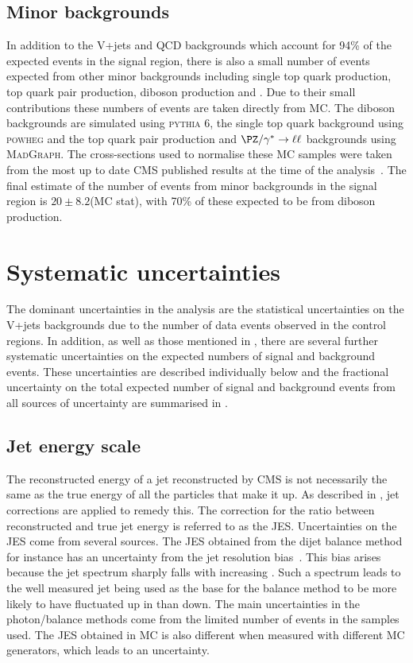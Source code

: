 \subsection{Minor backgrounds}
\label{sec:promptminor}
In addition to the V+jets and QCD backgrounds which account for 94\% of the expected events in the signal region, there is also a small number of events expected from other minor backgrounds including single top quark production, top quark pair production, diboson production and \Zmumu. Due to their small contributions these numbers of events are taken directly from \ac{MC}. The diboson backgrounds are simulated using \textsc{pythia 6}, the single top quark background using \textsc{powheg} and the top quark pair production and $\PZ/\gamma^{*}\rightarrow\ell\ell$ backgrounds using \textsc{MadGraph}. The cross-sections used to normalise these \ac{MC} samples were taken from the most up to date CMS published results at the time of the analysis~\cite{CMS:2012fza,CMS:2012iza,CMS:2012zva,CMS:2013qea,CMS:2013hea}. The final estimate of the number of events from minor backgrounds in the signal region is $20\pm 8.2$(MC stat), with 70\% of these expected to be from diboson production.


\section{Systematic uncertainties}
\label{sec:promptsyst}
The dominant uncertainties in the analysis are the statistical uncertainties on the V+jets backgrounds due to the number of data events observed in the control regions. In addition, as well as those mentioned in , there are several further systematic uncertainties on the expected numbers of signal and background events. These uncertainties are described individually below and the fractional uncertainty on the total expected number of signal and background events from all sources of uncertainty are summarised in .
\subsection{Jet energy scale}
\label{sec:promptjes}
The reconstructed energy of a jet reconstructed by CMS is not necessarily the same as the true energy of all the particles that make it up. As described in , jet corrections are applied to remedy this. The correction for the ratio between reconstructed and true jet energy is referred to as the \ac{JES}. Uncertainties on the \ac{JES} come from several sources. The \ac{JES} obtained from the dijet \pt balance method for instance has an uncertainty from the jet resolution bias~\cite{CMS-JME-10-011}. This bias arises because the jet \pt spectrum sharply falls with increasing \pt. Such a spectrum leads to the well measured jet being used as the base for the balance method to be more likely to have fluctuated up in \pt than down. The main uncertainties in the photon/\PZ balance methods come from the limited number of events in the samples used. The \ac{JES} obtained in \ac{MC} is also different when measured with different \ac{MC} generators, which leads to an uncertainty.

